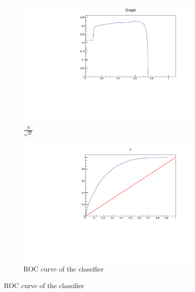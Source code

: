 \begin{figure}[h]
	\centering
	
	\begin{subfigure}{0.49\textwidth}
	      \includegraphics[width=\textwidth]{img/sig}
	      \caption{$\frac{S}{\sqrt{B}}$}
	\end{subfigure}
	\begin{subfigure}{0.49\textwidth}
	      \includegraphics[width=\textwidth]{img/roc}
	      \caption{ROC curve of the classifier}
	\end{subfigure}
	

\end{figure}
